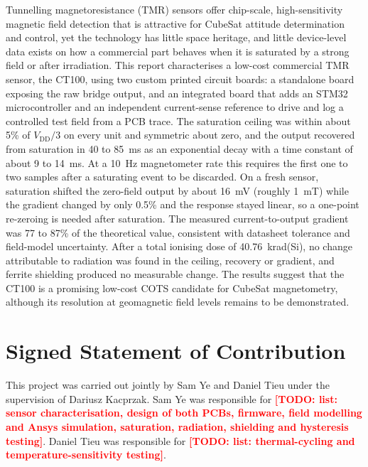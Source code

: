 \documentclass[12pt,a4paper]{article}
\newcommand{\todo}[1]{\textcolor{red}{\textbf{[TODO: #1]}}}
\begin{document}
Tunnelling magnetoresistance (TMR) sensors offer chip-scale, high-sensitivity magnetic field detection that is attractive for CubeSat attitude determination and control, yet the technology has little space heritage, and little device-level data exists on how a commercial part behaves when it is saturated by a strong field or after irradiation. This report characterises a low-cost commercial TMR sensor, the CT100, using two custom printed circuit boards: a standalone board exposing the raw bridge output, and an integrated board that adds an STM32 microcontroller and an independent current-sense reference to drive and log a controlled test field from a PCB trace. The saturation ceiling was within about 5\% of $V_{\text{DD}}/3$ on every unit and symmetric about zero, and the output recovered from saturation in 40 to \SI{85}{\milli\second} as an exponential decay with a time constant of about 9 to \SI{14}{\milli\second}. At a \SI{10}{\hertz} magnetometer rate this requires the first one to two samples after a saturating event to be discarded. On a fresh sensor, saturation shifted the zero-field output by about \SI{16}{\milli\volt} (roughly \SI{1}{\milli\tesla}) while the gradient changed by only 0.5\% and the response stayed linear, so a one-point re-zeroing is needed after saturation. The measured current-to-output gradient was 77 to 87\% of the theoretical value, consistent with datasheet tolerance and field-model uncertainty. After a total ionising dose of \SI{40.76}{\kilo rad}(Si), no change attributable to radiation was found in the ceiling, recovery or gradient, and ferrite shielding produced no measurable change. The results suggest that the CT100 is a promising low-cost COTS candidate for CubeSat magnetometry, although its resolution at geomagnetic field levels remains to be demonstrated.

\clearpage

\section*{Signed Statement of Contribution}
This project was carried out jointly by Sam Ye and Daniel Tieu under the supervision of Dariusz Kacprzak. Sam Ye was responsible for \todo{list: sensor characterisation, design of both PCBs, firmware, field modelling and Ansys simulation, saturation, radiation, shielding and hysteresis testing}. Daniel Tieu was responsible for \todo{list: thermal-cycling and temperature-sensitivity testing}.
 
\end{document}
